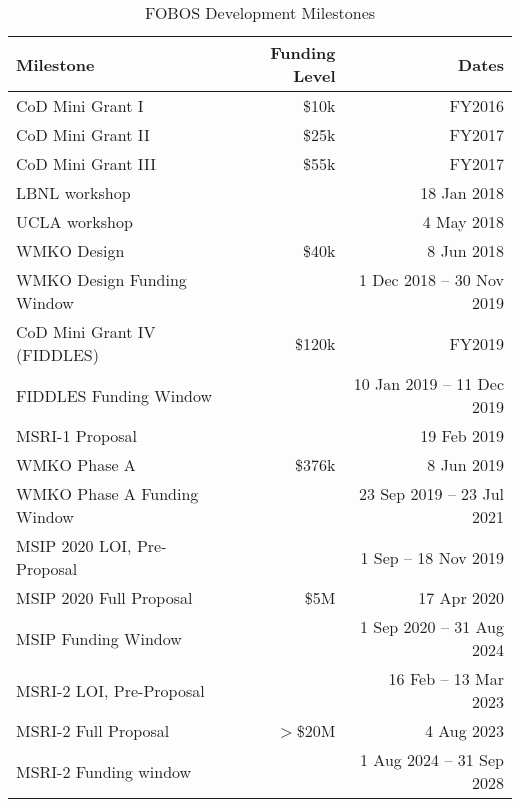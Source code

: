 \begin{table}[h!]
\centering
\footnotesize
\caption{FOBOS Development Milestones}
\label{tab:milestones}
\vspace*{-10pt}
\begin{tabular}{l r r}
Milestone                     & Funding Level & Dates \\
\hline
\hline
CoD Mini Grant I              &  \$10k & FY2016 \\
CoD Mini Grant II             &  \$25k & FY2017 \\
CoD Mini Grant III            &  \$55k & FY2017 \\
LBNL workshop                 &        & 18 Jan 2018 \\
UCLA workshop                 &        & 4 May 2018 \\
WMKO Design                   &  \$40k & 8 Jun 2018 \\
WMKO Design Funding Window    &        & 1 Dec 2018 -- 30 Nov 2019 \\
CoD Mini Grant IV (FIDDLES)   & \$120k & FY2019 \\
FIDDLES Funding Window        &        & 10 Jan 2019 -- 11 Dec 2019 \\
\hline
MSRI-1 Proposal               &        & 19 Feb 2019 \\
WMKO Phase A                  & \$376k & 8 Jun 2019 \\
WMKO Phase A Funding Window   &        & 23 Sep 2019 -- 23 Jul 2021 \\
\hline
MSIP 2020 LOI, Pre-Proposal   &        & 1 Sep -- 18 Nov 2019 \\
MSIP 2020 Full Proposal       &   \$5M & 17 Apr 2020 \\
MSIP Funding Window           &        & 1 Sep 2020 -- 31 Aug 2024 \\
\hline
MSRI-2 LOI, Pre-Proposal      &        & 16 Feb -- 13 Mar 2023 \\
MSRI-2 Full Proposal          & $>$\$20M & 4 Aug 2023 \\
MSRI-2 Funding window         &        & 1 Aug 2024 -- 31 Sep 2028 \\
\hline
\end{tabular}
\end{table}

\newpage







